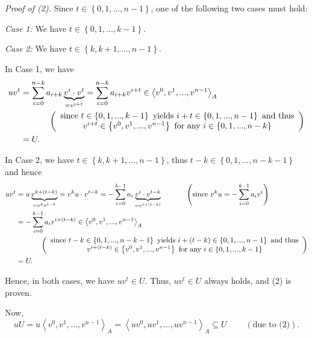 \documentclass[12pt,final,notitlepage,onecolumn]{article}%
\begin{document}
\textit{Proof of (2).} Since $t\in\left\{  0,1,...,n-1\right\}  $, one of the
following two cases must hold:

\textit{Case 1:} We have $t\in\left\{  0,1,...,k-1\right\}  $.

\textit{Case 2:} We have $t\in\left\{  k,k+1,...,n-1\right\}  $.

In Case 1, we have%
\begin{align*}
uv^{t}  &  =\sum\limits_{i=0}^{n-k}a_{i+k}\underbrace{v^{i}\cdot v^{t}%
}_{=v^{i+t}}=\sum\limits_{i=0}^{n-k}a_{i+k}v^{i+t}\in\left\langle v^{0}%
,v^{1},...,v^{n-1}\right\rangle _{A}\\
&  \ \ \ \ \ \ \ \ \ \ \left(
\begin{array}
[c]{c}%
\text{since }t\in\left\{  0,1,...,k-1\right\}  \text{ yields }i+t\in\left\{
0,1,...,n-1\right\}  \text{ and thus}\\
v^{i+t}\in\left\{  v^{0},v^{1},...,v^{n-1}\right\}  \text{ for any }%
i\in\left\{  0,1,...,n-k\right\}
\end{array}
\right) \\
&  =U.
\end{align*}


In Case 2, we have $t\in\left\{  k,k+1,...,n-1\right\}  $, thus $t-k\in
\left\{  0,1,...,n-k-1\right\}  $ and hence%
\begin{align*}
uv^{t}  &  =u\underbrace{v^{k+\left(  t-k\right)  }}_{=v^{k}v^{t-k}}%
=v^{k}u\cdot v^{t-k}=-\sum\limits_{i=0}^{k-1}a_{i}\underbrace{v^{i}\cdot
v^{t-k}}_{=v^{i+\left(  t-k\right)  }}\ \ \ \ \ \ \ \ \ \ \left(  \text{since
}v^{k}u=-\sum\limits_{i=0}^{k-1}a_{i}v^{i}\right) \\
&  =-\sum\limits_{i=0}^{k-1}a_{i}v^{i+\left(  t-k\right)  }\in\left\langle
v^{0},v^{1},...,v^{n-1}\right\rangle _{A}\\
&  \ \ \ \ \ \ \ \ \ \ \left(
\begin{array}
[c]{c}%
\text{since }t-k\in\left\{  0,1,...,n-k-1\right\}  \text{ yields }i+\left(
t-k\right)  \in\left\{  0,1,...,n-1\right\}  \text{ and thus}\\
v^{i+\left(  t-k\right)  }\in\left\{  v^{0},v^{1},...,v^{n-1}\right\}  \text{
for any }i\in\left\{  0,1,...,k-1\right\}
\end{array}
\right) \\
&  =U.
\end{align*}


Hence, in both cases, we have $uv^{t}\in U$. Thus, $uv^{t}\in U$ always holds,
and (2) is proven.

Now,%
\[
uU=u\left\langle v^{0},v^{1},...,v^{n-1}\right\rangle _{A}=\left\langle
uv^{0},uv^{1},...,uv^{n-1}\right\rangle _{A}\subseteq
U\ \ \ \ \ \ \ \ \ \ \left(  \text{due to (2)}\right)  .
\]
\end{document}
